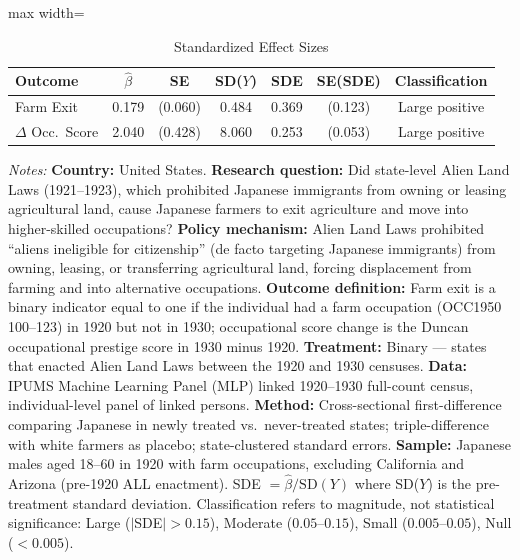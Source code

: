 \begin{table}[htbp]
\centering
\caption{Standardized Effect Sizes}
\label{tab:sde}
\begin{adjustbox}{max width=\textwidth}
\begin{tabular}{lcccccc}
\hline\hline
Outcome & $\hat{\beta}$ & SE & SD($Y$) & SDE & SE(SDE) & Classification \\
\hline
Farm Exit & 0.179 & (0.060) & 0.484 & 0.369 & (0.123) & Large positive \\
$\Delta$ Occ.\ Score & 2.040 & (0.428) & 8.060 & 0.253 & (0.053) & Large positive \\
\hline\hline
\end{tabular}
\end{adjustbox}
\begin{tablenotes}
\item \textit{Notes:} \textbf{Country:} United States. \textbf{Research question:} Did state-level Alien Land Laws (1921--1923), which prohibited Japanese immigrants from owning or leasing agricultural land, cause Japanese farmers to exit agriculture and move into higher-skilled occupations? \textbf{Policy mechanism:} Alien Land Laws prohibited ``aliens ineligible for citizenship'' (de facto targeting Japanese immigrants) from owning, leasing, or transferring agricultural land, forcing displacement from farming and into alternative occupations. \textbf{Outcome definition:} Farm exit is a binary indicator equal to one if the individual had a farm occupation (OCC1950 100--123) in 1920 but not in 1930; occupational score change is the Duncan occupational prestige score in 1930 minus 1920. \textbf{Treatment:} Binary --- states that enacted Alien Land Laws between the 1920 and 1930 censuses. \textbf{Data:} IPUMS Machine Learning Panel (MLP) linked 1920--1930 full-count census, individual-level panel of linked persons. \textbf{Method:} Cross-sectional first-difference comparing Japanese in newly treated vs.\ never-treated states; triple-difference with white farmers as placebo; state-clustered standard errors. \textbf{Sample:} Japanese males aged 18--60 in 1920 with farm occupations, excluding California and Arizona (pre-1920 ALL enactment). SDE $= \hat{\beta} / \text{SD}(Y)$ where SD($Y$) is the pre-treatment standard deviation. Classification refers to magnitude, not statistical significance: Large ($|$SDE$| > 0.15$), Moderate ($0.05$--$0.15$), Small ($0.005$--$0.05$), Null ($< 0.005$). 
\end{tablenotes}
\end{table}
